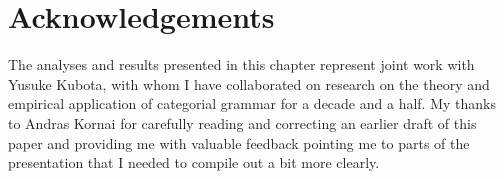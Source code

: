 \documentclass[output=paper,colorlinks,citecolor=brown]{langscibook}
\begin{document}
\section*{Acknowledgements}
The analyses and results
presented in this chapter represent joint work with Yusuke Kubota, with whom I
have collaborated on research on the theory and empirical application of
categorial grammar for a decade and a half. My thanks to Andras Kornai
for carefully reading and correcting an earlier draft of this paper
and providing me with valuable feedback pointing me to parts of
the presentation that I needed to compile out a bit more clearly.

{\sloppy\printbibliography[heading=subbibliography,notkeyword=this]}
\end{document}
